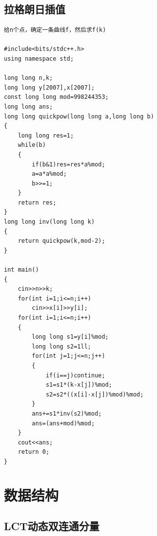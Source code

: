 \documentclass[11pt,a4paper]{ctexart}
\begin{document}
\subsection{拉格朗日插值}

\begin{lstlisting}
给n个点，确定一条曲线f，然后求f(k)

#include<bits/stdc++.h>
using namespace std;

long long n,k;
long long y[2007],x[2007];
const long long mod=998244353;
long long ans;
long long quickpow(long long a,long long b)
{
	long long res=1;
	while(b)
	{
		if(b&1)res=res*a%mod;
		a=a*a%mod;
		b>>=1;
	}
	return res;
}
long long inv(long long k)
{
	return quickpow(k,mod-2);
}

int main()
{
	cin>>n>>k;
	for(int i=1;i<=n;i++)
		cin>>x[i]>>y[i];
	for(int i=1;i<=n;i++)
	{
		long long s1=y[i]%mod;
		long long s2=1ll;
		for(int j=1;j<=n;j++)
		{
			if(i==j)continue;
			s1=s1*(k-x[j])%mod;
			s2=s2*((x[i]-x[j])%mod)%mod;
		}
		ans+=s1*inv(s2)%mod;
		ans=(ans+mod)%mod;
	}
	cout<<ans;
	return 0;
}
\end{lstlisting}

\section{数据结构}

\subsection{LCT动态双连通分量}
\end{document}
